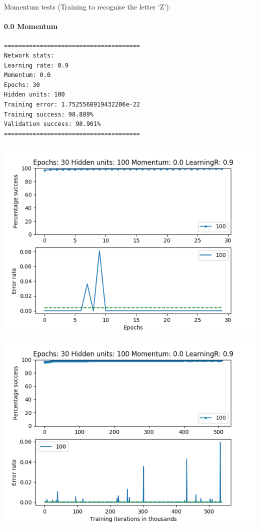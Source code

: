 \documentclass[11pt]{article}
\makeatletter
\def\maxwidth{\ifdim\Gin@nat@width>\linewidth\linewidth
    \else\Gin@nat@width\fi}
\let\Oldincludegraphics\includegraphics
\renewcommand{\includegraphics}[1]{\Oldincludegraphics[width=.8\maxwidth]{#1}}
\makeatother
\begin{document}
Momentum tests (Training to recognise the letter `Z'):

\hypertarget{momentum}{%
\paragraph{0.0 Momentum}\label{momentum}}

\begin{verbatim}
======================================
Network stats: 
Learning rate: 0.9
Momentum: 0.0
Epochs: 30
Hidden units: 100
Training error: 1.7525568919432206e-22
Training success: 98.889%
Validation success: 98.901%
======================================
\end{verbatim}

\includegraphics{Experiment1/E1_NN_Epoch_Momentum_0.0_30Epochs_100_LR_0.9_Hiddenunits.png}
\includegraphics{Experiment1/E1_NN_Training_Momentum_0.0_30Epochs_100_LR_0.9_Hiddenunits.png}
\end{document}
